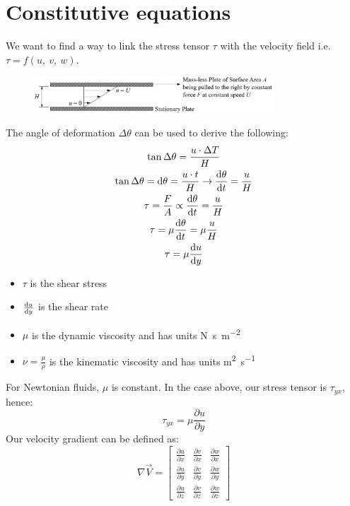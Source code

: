 \documentclass[class=report, crop=false, 12pt,a4paper]{standalone}
\begin{document}
\section{Constitutive equations}
We want to find a way to link the stress tensor $\tau$ with the velocity field i.e. $\tau = f(u, \ v, \ w)$.
\begin{figure}[H]
  \centering
  \includegraphics[width = 0.8\textwidth]{../img/diagram1.png}
\end{figure}
The angle of deformation $\Delta \theta$ can be used to derive the following:
\begin{gather}
  \tan{\Delta \theta} = \frac{u \cdot \Delta T}{H}\\
  \tan{\Delta \theta} = \dif \theta = \frac{u\cdot t}{H} \rightarrow \frac{\dif \theta}{\dif t} = \frac{u}{H}\\
  \tau = \frac{F}{A} \propto \frac{\dif \theta}{\dif t} = \frac{u}{H}\\
  \tau = \mu \frac{\dif \theta}{\dif t} = \mu \frac{u}{H}\\
  \tau = \mu \frac{\dif u}{\dif y}
\end{gather}
\begin{itemize}
  \item $\tau$ is the shear stress
  \item $\frac{\dif u}{\dif y}$ is the shear rate
  \item $\mu$ is the dynamic viscosity and has units \si{\newton\second\per\meter\squared}
  \item $\nu = \frac{\mu}{\rho}$ is the kinematic viscosity and has units \si{\meter\squared\per\second}
\end{itemize}
For Newtonian fluids, $\mu$ is constant. In the case above, our stress tensor is $\tau_{yx}$, hence:
\begin{equation}
  \tau_{yx} = \mu \frac{\partial u}{\partial y}
\end{equation}
Our velocity gradient can be defined as:
\begin{equation}
  \nabla \vec{V} = \begin{bmatrix}
    \frac{\partial u}{\partial x} & \frac{\partial v}{\partial x} & \frac{\partial w}{\partial x}\\
    \frac{\partial u}{\partial y} & \frac{\partial v}{\partial y} & \frac{\partial w}{\partial y}\\
    \frac{\partial u}{\partial z} & \frac{\partial v}{\partial z} & \frac{\partial w}{\partial z}
  \end{bmatrix}
\end{equation}
\end{document}
